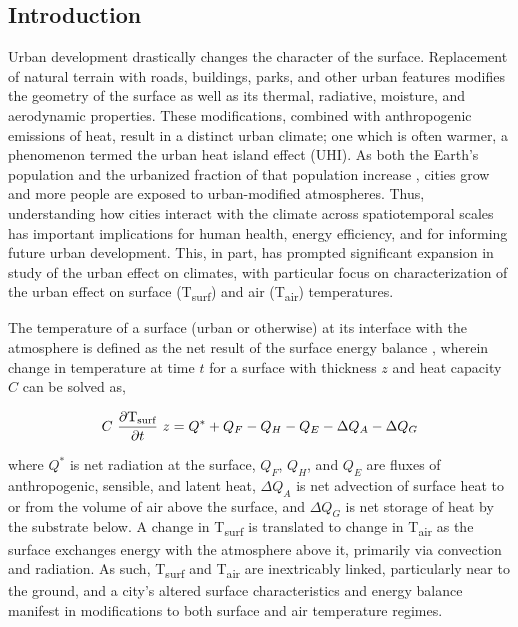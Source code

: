 \begin{bibunit}
	
\rhead{\thepage}

\chapter{Introduction}
\label{intro}

Urban development drastically changes the character of the surface. Replacement of natural terrain with roads, buildings, parks, and other urban features modifies the geometry of the surface as well as its thermal, radiative, moisture, and aerodynamic properties. These modifications, combined with anthropogenic emissions of heat, result in a distinct urban climate; one which is often warmer, a phenomenon termed the urban heat island effect (UHI). As both the Earth's population and the urbanized fraction of that population increase \citep{Nations2014}, cities grow and more people are exposed to urban-modified atmospheres. Thus, understanding how cities interact with the climate across spatiotemporal scales has important implications for human health, energy efficiency, and for informing future urban development. This, in part, has prompted significant expansion in study of the urban effect on climates, with particular focus on characterization of the urban effect on surface (T\textsubscript{surf}) and air (T\textsubscript{air}) temperatures.

\pagebreak

The temperature of a surface (urban or otherwise) at its interface with the atmosphere is defined as the net result of the surface energy balance \citep{Oke2017}, wherein change in temperature at time $t$ for a surface with thickness $z$ and heat capacity $C$ can be solved as,

\begin{equation}
	C~\frac{\partial \text{T\textsubscript{surf}}}{\partial t}~z = Q^*+ Q_F - Q_H - Q_E - \Delta Q_A - \Delta Q_G
\end{equation}

\noindent where $Q^*$ is net radiation at the surface, $Q_F$, $Q_H$, and $Q_E$ are fluxes of anthropogenic, sensible, and latent heat, $\Delta Q_A$ is net advection of surface heat to or from the volume of air above the surface, and $\Delta Q_G$ is net storage of heat by the substrate below. A change in T\textsubscript{surf} is translated to change in T\textsubscript{air} as the surface exchanges energy with the atmosphere above it, primarily via convection and radiation. As such, T\textsubscript{surf} and T\textsubscript{air} are inextricably linked, particularly near to the ground, and a city's altered surface characteristics and energy balance manifest in modifications to both surface and air temperature regimes.


\end{bibunit}
